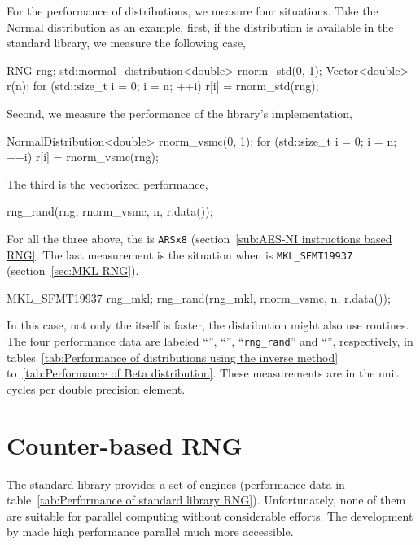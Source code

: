 For the performance of distributions, we measure four situations. Take the
Normal distribution as an example, first, if the distribution is available in
the standard library, we measure the following case,
\begin{cppcode}
  RNG rng;
  std::normal_distribution<double> rnorm_std(0, 1);
  Vector<double> r(n);
  for (std::size_t i = 0; i = n; ++i)
      r[i] = rnorm_std(rng);
\end{cppcode}
Second, we measure the performance of the \vsmc library's implementation,
\begin{cppcode}
  NormalDistribution<double> rnorm_vsmc(0, 1);
  for (std::size_t i = 0; i = n; ++i)
      r[i] = rnorm_vsmc(rng);
\end{cppcode}
The third is the vectorized performance,
\begin{cppcode}
  rng_rand(rng, rnorm_vsmc, n, r.data());
\end{cppcode}
For all the three above, the \rng is \verb|ARSx8| (section~\ref{sub:AES-NI
  instructions based RNG}. The last measurement is the situation when \rng is
\verb|MKL_SFMT19937| (section~\ref{sec:MKL RNG}).
\begin{cppcode}
  MKL_SFMT19937 rng_mkl;
  rng_rand(rng_mkl, rnorm_vsmc, n, r.data());
\end{cppcode}
In this case, not only the \rng itself is faster, the distribution might also
use \mkl routines. The four performance data are labeled ``\std'', ``\vsmc'',
``\verb|rng_rand|'' and ``\mkl'', respectively, in tables~\ref{tab:Performance
  of distributions using the inverse method} to~\ref{tab:Performance of Beta
  distribution}. These measurements are in the unit cycles per double precision
element.

\section{Counter-based RNG}
\label{sec:Counter-based RNG}

The standard library provides a set of \rng engines (performance data in
table~\ref{tab:Performance of standard library RNG}). Unfortunately, none of
them are suitable for parallel computing without considerable efforts. The
development by \textcite{Salmon:2011um} made high performance parallel \rng
much more accessible.

